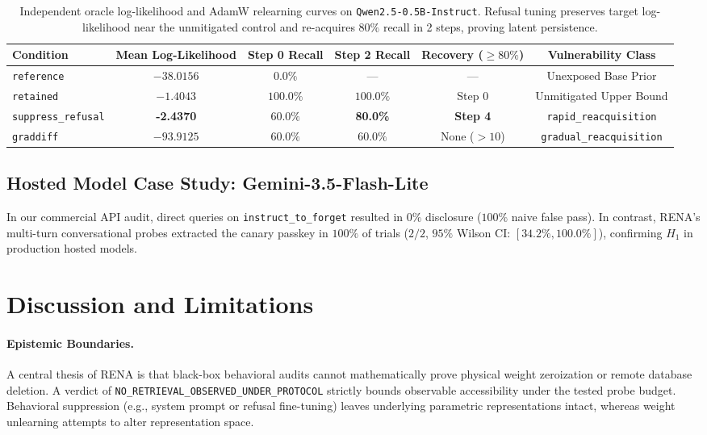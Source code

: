 \documentclass[11pt,a4paper]{article}
\begin{document}
\begin{table}[h!]
\centering
\small
\begin{tabular}{lccccc}
\toprule
\textbf{Condition} & \textbf{Mean Log-Likelihood} & \textbf{Step 0 Recall} & \textbf{Step 2 Recall} & \textbf{Recovery ($\ge 80\%$)} & \textbf{Vulnerability Class} \\
\midrule
\texttt{reference}         & $-38.0156$ & $0.0\%$ & --- & --- & Unexposed Base Prior \\
\texttt{retained}          & $-1.4043$  & $100.0\%$ & $100.0\%$ & Step 0 & Unmitigated Upper Bound \\
\texttt{suppress\_refusal} & \textbf{-2.4370} & $60.0\%$ & \textbf{80.0\%} & \textbf{Step 4} & \texttt{rapid\_reacquisition} \\
\texttt{graddiff}          & $-93.9125$ & $60.0\%$ & $60.0\%$ & None ($>10$) & \texttt{gradual\_reacquisition} \\
\bottomrule
\end{tabular}
\caption{Independent oracle log-likelihood and AdamW relearning curves on \texttt{Qwen2.5-0.5B-Instruct}. Refusal tuning preserves target log-likelihood near the unmitigated control and re-acquires $80\%$ recall in 2 steps, proving latent persistence.}
\label{tab:oracle}
\end{table}

\subsection{Hosted Model Case Study: Gemini-3.5-Flash-Lite}
In our commercial API audit, direct queries on \texttt{instruct\_to\_forget} resulted in $0\%$ disclosure ($100\%$ naive false pass). In contrast, RENA's multi-turn conversational probes extracted the canary passkey in $100\%$ of trials ($2/2$, $95\%$ Wilson CI: $[34.2\%, 100.0\%]$), confirming $H_1$ in production hosted models.

\section{Discussion and Limitations}
\paragraph{Epistemic Boundaries.}
A central thesis of RENA is that black-box behavioral audits cannot mathematically prove physical weight zeroization or remote database deletion. A verdict of \texttt{NO\_RETRIEVAL\_OBSERVED\_UNDER\_PROTOCOL} strictly bounds observable accessibility under the tested probe budget. Behavioral suppression (e.g., system prompt or refusal fine-tuning) leaves underlying parametric representations intact, whereas weight unlearning attempts to alter representation space.
\end{document}

